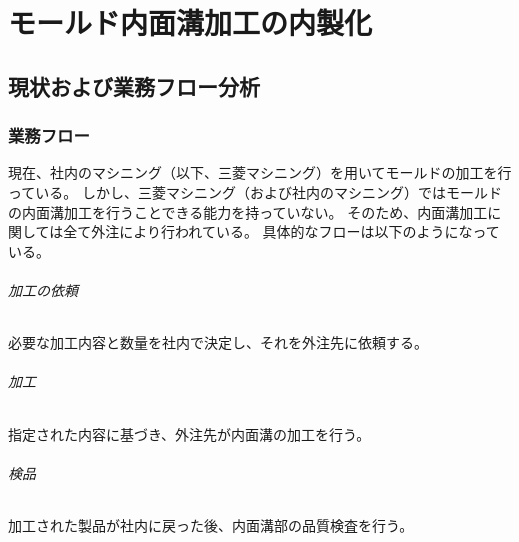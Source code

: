 \part{モールド内面溝加工の内製化}




\chapter{現状および業務フロー分析}



\section{業務フロー}
現在、社内のマシニング（以下、三菱マシニング）を用いてモールドの加工を行っている。
しかし、三菱マシニング（および社内のマシニング）ではモールドの内面溝加工を行うことできる能力を持っていない。
そのため、内面溝加工に関しては全て外注により行われている。
具体的なフローは以下のようになっている。

\paragraph{加工の依頼}
必要な加工内容と数量を社内で決定し、それを外注先に依頼する。

\paragraph{加工}
指定された内容に基づき、外注先が内面溝の加工を行う。

\paragraph{検品}
加工された製品が社内に戻った後、内面溝部の品質検査を行う。



